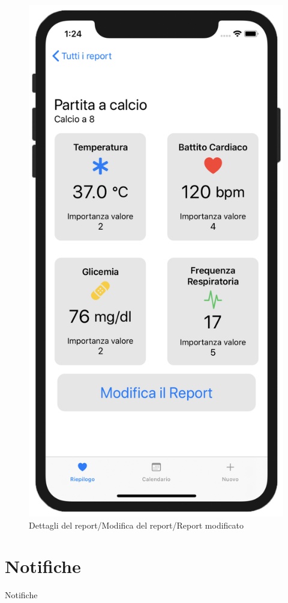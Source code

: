 \documentclass{article}
\begin{document}
\begin{figure}[htp]
\includegraphics[width=.32\textwidth]{img/ReportView1.png}

\caption{Dettagli del report/Modifica del report/Report modificato}
\label{fig:figure5}

\end{figure}



\newpage
\section{Notifiche}

Notifiche












\end{document}
